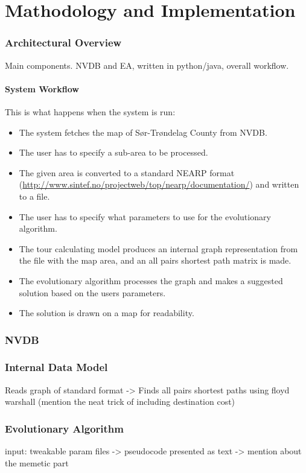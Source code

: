 \chapter{Mathodology and Implementation}

\subsection{Architectural Overview}
Main components. NVDB and EA, written in python/java, overall workflow.

\subsubsection{System Workflow}
This is what happens when the system is run:

\begin{itemize}
	\item The system fetches the map of Sør-Trøndelag County from NVDB.
	\item The user has to specify a sub-area to be processed.
	\item The given area is converted to a standard NEARP format (\url{http://www.sintef.no/projectweb/top/nearp/documentation/}) and written to a file.
	\item The user has to specify what parameters to use for the evolutionary algorithm.
	\item The tour calculating model produces an internal graph representation from the file with the map area, and an all pairs shortest path matrix is made.
	\item The evolutionary algorithm processes the graph and makes a suggested solution based on the users parameters.
	\item The solution is drawn on a map for readability.
\end{itemize}

\subsection{NVDB}

\subsection{Internal Data Model}
Reads graph of standard format -> Finds all pairs shortest paths using floyd warshall (mention the neat trick of including destination cost)

\subsection{Evolutionary Algorithm}
input: tweakable param files -> pseudocode presented as text -> mention about the memetic part

